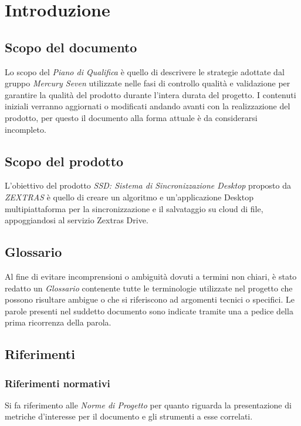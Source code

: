 \section{Introduzione}
\subsection{Scopo del documento}

Lo scopo del  \textit{Piano di Qualifica}  è quello di descrivere le strategie adottate dal gruppo \textit{Mercury Seven} utilizzate nelle fasi di controllo qualità e validazione per garantire la qualità del prodotto durante l'intera durata del progetto.  I contenuti iniziali verranno aggiornati o modificati andando avanti con la realizzazione del prodotto,  per questo il documento alla forma attuale è da considerarsi incompleto.  

\subsection{Scopo del prodotto}

L'obiettivo del prodotto \textit{SSD: Sistema di Sincronizzazione Desktop} proposto da \textit{ZEXTRAS} è quello di creare un algoritmo e un'applicazione Desktop multipiattaforma per la sincronizzazione e il salvataggio su cloud di file,  appoggiandosi al servizio Zextras Drive.  

\subsection{Glossario}

Al fine di evitare incomprensioni o ambiguità dovuti a termini non chiari,  è stato redatto un \textit{Glossario} contenente tutte le terminologie utilizzate nel progetto che possono risultare ambigue o che si riferiscono ad argomenti tecnici o specifici.  Le parole presenti nel suddetto documento sono indicate tramite una \glo{} a pedice della prima ricorrenza della parola. 

\subsection{Riferimenti}
\subsubsection{Riferimenti normativi}
Si fa riferimento alle \textit{Norme di Progetto} per quanto riguarda la presentazione di metriche d'interesse per il documento e gli strumenti a esse correlati. 
